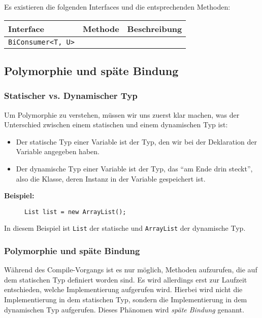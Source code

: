 			Es existieren die folgenden Interfaces und die entsprechenden Methoden:
			\begin{table}[H]
				\centering
				\begin{tabular}{l | l | l}
					\textbf{Interface} & \textbf{Methode} & \textbf{Beschreibung} \\ \hline
					\lstinline|BiConsumer<T, U>| & & \\
				\end{tabular}
			\end{table}

\subsection{Polymorphie und späte Bindung}
	
	\subsubsection{Statischer vs. Dynamischer Typ}
		\label{sec:dynamic_static_type}
		
		Um Polymorphie zu verstehen, müssen wir uns zuerst klar machen, was der Unterschied zwischen einem statischen und einem dynamischen Typ ist:
		\begin{itemize}
			\item Der statische Typ einer Variable ist der Typ, den wir bei der Deklaration der Variable angegeben haben.
			\item Der dynamische Typ einer Variable ist der Typ, das \enquote{am Ende drin steckt}, also die Klasse, deren Instanz in der Variable gespeichert ist.
		\end{itemize}
	
		\textbf{Beispiel:}
		\begin{figure}[H]
			\centering
			\lstinline|List list = new ArrayList();|
		\end{figure}
		In diesem Beispiel ist \lstinline|List| der statische und \lstinline|ArrayList| der dynamische Typ.
	
	\subsubsection{Polymorphie und späte Bindung}
		Während des Compile-Vorgangs ist es nur möglich, Methoden aufzurufen, die auf dem statischen Typ definiert worden sind. Es wird allerdings erst zur Laufzeit entschieden, welche Implementierung aufgerufen wird. Hierbei wird nicht die Implementierung in dem statischen Typ, sondern die Implementierung in dem dynamischen Typ aufgerufen. Dieses Phänomen wird \textit{späte Bindung} genannt.
		
